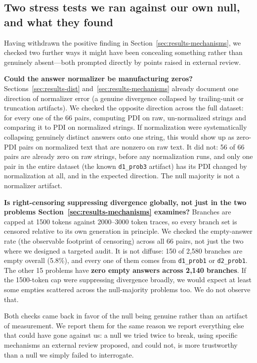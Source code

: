 \documentclass{article}
\begin{document}
\subsection{Two stress tests we ran against our own null, and what they found}
\label{sec:lim-stresstests}

Having withdrawn the positive finding in Section~\ref{sec:results-mechanisms}, we checked two further ways it might have been concealing something rather than genuinely absent---both prompted directly by points raised in external review.

\textbf{Could the answer normalizer be manufacturing zeros?} Sections~\ref{sec:results-dist} and~\ref{sec:results-mechanisms} already document one direction of normalizer error (a genuine divergence collapsed by trailing-unit or truncation artifacts). We checked the opposite direction across the full dataset: for every one of the 66 pairs, computing PDI on raw, un-normalized strings and comparing it to PDI on normalized strings. If normalization were systematically collapsing genuinely distinct answers onto one string, this would show up as zero-PDI pairs on normalized text that are nonzero on raw text. It did not: 56 of 66 pairs are already zero on raw strings, before any normalization runs, and only one pair in the entire dataset (the known \texttt{d1\_prob3} artifact) has its PDI changed by normalization at all, and in the expected direction. The null majority is not a normalizer artifact.

\textbf{Is right-censoring suppressing divergence globally, not just in the two problems Section~\ref{sec:results-mechanisms} examines?} Branches are capped at 1500 tokens against 2000--3000 token traces, so every branch set is censored relative to its own generation in principle. We checked the empty-answer rate (the observable footprint of censoring) across all 66 pairs, not just the two where we designed a targeted audit. It is not diffuse: 150 of 2,580 branches are empty overall (5.8\%), and every one of them comes from \texttt{d1\_prob1} or \texttt{d2\_prob1}. The other 15 problems have \textbf{zero empty answers across 2,140 branches}. If the 1500-token cap were suppressing divergence broadly, we would expect at least some empties scattered across the null-majority problems too. We do not observe that.

Both checks came back in favor of the null being genuine rather than an artifact of measurement. We report them for the same reason we report everything else that could have gone against us: a null we tried twice to break, using specific mechanisms an external review proposed, and could not, is more trustworthy than a null we simply failed to interrogate.
\end{document}
